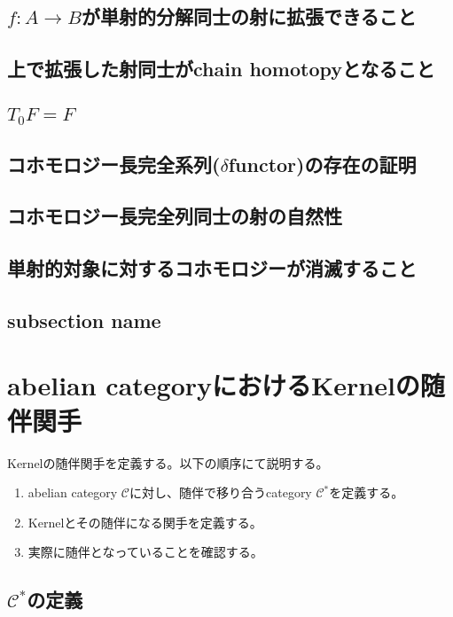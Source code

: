 \documentclass{ujarticle}
\begin{document}
  \subsection{ $f:A\to B$が単射的分解同士の射に拡張できること }
  \subsection{ 上で拡張した射同士がchain homotopyとなること }
  \subsection{ $T_0F =F$ }
  \subsection{ コホモロジー長完全系列($\delta$functor)の存在の証明}
  \subsection{ コホモロジー長完全列同士の射の自然性}
  \subsection{ 単射的対象に対するコホモロジーが消滅すること}


\subsection{subsection name}
\label{sub:subsection label}




\section{abelian categoryにおけるKernelの随伴関手}
\label{sec:abelian categoryで、Kernelの随伴関手}
Kernelの随伴関手を定義する。以下の順序にて説明する。
\begin{enumerate}
  \item abelian category $ \mathcal{C}$に対し、随伴で移り合うcategory $\mathcal{C}^*$を定義する。
  \item Kernelとその随伴になる関手を定義する。
  \item 実際に随伴となっていることを確認する。
\end{enumerate}

\subsection{$\mathcal{C}^*$の定義}
\end{document}
